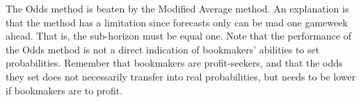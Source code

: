 \newpar

The Odds method is beaten by the Modified Average method. An explanation is that the method has a limitation since forecasts only can be mad one gameweek ahead. That is, the sub-horizon must be equal one. Note that the performance of the Odds method is not a direct indication of bookmakers' abilities to set probabilities. Remember that bookmakers are profit-seekers, and that the odds they set does not necessarily transfer into real probabilities, but needs to be lower if bookmakers are to profit. 

